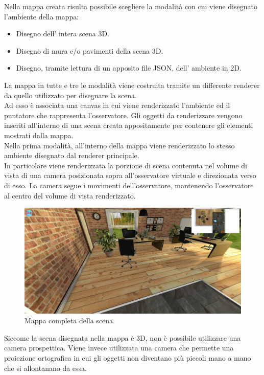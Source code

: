 Nella mappa creata risulta possibile scegliere la modalità con cui viene disegnato l’ambiente della mappa:
\begin{itemize}
\item Disegno dell’ intera scena 3D.
\item Disegno di mura e/o pavimenti della scena 3D.
\item Disegno, tramite lettura di un apposito file JSON, dell’ ambiente in 2D.
\end{itemize}

La mappa in tutte e tre le modalità viene costruita tramite un differente renderer da quello utilizzato per disegnare la scena. 
\\
Ad esso è associata una canvas in cui viene renderizzato l’ambiente ed il puntatore che rappresenta l’osservatore. Gli oggetti da renderizzare vengono inseriti all’interno di una scena creata appositamente per contenere gli elementi mostrati dalla mappa.
\\
Nella prima modalità, all’interno della mappa viene renderizzato lo stesso ambiente disegnato dal renderer principale.
\\
In particolare viene renderizzata la porzione di scena contenuta nel volume di vista di una camera posizionata sopra all’osservatore virtuale e direzionata verso di esso.
La camera segue i movimenti dell’osservatore, mantenendo l’osservatore al centro del volume di vista renderizzato.
\begin{figure}[htb]
 \centering
 \includegraphics[width=1\linewidth]{images/chapter_navigazione_scena/map_3d.png}\hfill
 \caption[Mappa completa della scena.]{Mappa completa della scena.}
 \label{fig:navigazione_scena_map_3d}
\end{figure}
Siccome la scena disegnata nella mappa è 3D, non è possibile utilizzare una camera prospettica. Viene invece utilizzata una camera che permette una proiezione ortografica in cui gli oggetti non diventano più piccoli mano a mano che si allontanano da essa.
